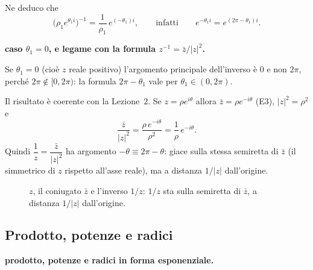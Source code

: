 \documentclass[11pt,a4paper]{article}
\renewcommand{\Re}{\operatorname{Re}}
\renewcommand{\Im}{\operatorname{Im}}
\theoremstyle{plain}
\theoremstyle{definition}
\theoremstyle{remark}
\begin{document}
Ne deduco che
\[
  \bigl(\rho_1e^{\theta_1i}\bigr)^{-1}=\frac1{\rho_1}\,e^{(-\theta_1)i},
  \qquad\text{infatti}\qquad e^{-\theta_1i}=e^{(2\pi-\theta_1)i}.
\]

\par\medskip
\noindent\textbf{caso $\theta_1=0$, e legame con la formula $z^{-1}=\bar z/|z|^2$.}\par

Se $\theta_1=0$ (cioè $z$ reale positivo) l'argomento principale dell'inverso è $0$ e non $2\pi$, perché $2\pi\notin[0,2\pi)$:
la formula $2\pi-\theta_1$ vale per $\theta_1\in(0,2\pi)$.

\smallskip
Il risultato è coerente con la Lezione~2. Se $z=\rho e^{i\theta}$ allora $\bar z=\rho e^{-i\theta}$ (E3), $|z|^2=\rho^2$ e
\[
  \frac{\bar z}{|z|^2}=\frac{\rho\,e^{-i\theta}}{\rho^2}=\frac1\rho\,e^{-i\theta}.
\]
Quindi $\dfrac1z=\dfrac{\bar z}{|z|^2}$ ha argomento $-\theta\equiv2\pi-\theta$: giace sulla stessa semiretta di $\bar z$
(il simmetrico di $z$ rispetto all'asse reale), ma a distanza $1/|z|$ dall'origine.
\par\medskip

\begin{figure}[h]
\centering
{}
\caption{$z$, il coniugato $\bar z$ e l'inverso $1/z$: $1/z$ sta sulla semiretta di $\bar z$, a distanza $1/|z|$ dall'origine.}
\end{figure}

\subsection{Prodotto, potenze e radici}

\par\medskip
\noindent\textbf{prodotto, potenze e radici in forma esponenziale.}\par
\end{document}
